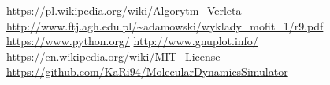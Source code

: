 \documentclass[a4paper,10pt]{article}
\begin{document}
\newpage
\vfill
\begin{thebibliography}{9}
    \url{https://pl.wikipedia.org/wiki/Algorytm_Verleta}
	\url{http://www.ftj.agh.edu.pl/~adamowski/wyklady_mofit_1/r9.pdf}
    \url{https://www.python.org/}
    \url{http://www.gnuplot.info/}
	\url{https://en.wikipedia.org/wiki/MIT_License}
	\url{https://github.com/KaRi94/MolecularDynamicsSimulator}

\end{thebibliography}
\end{document}
